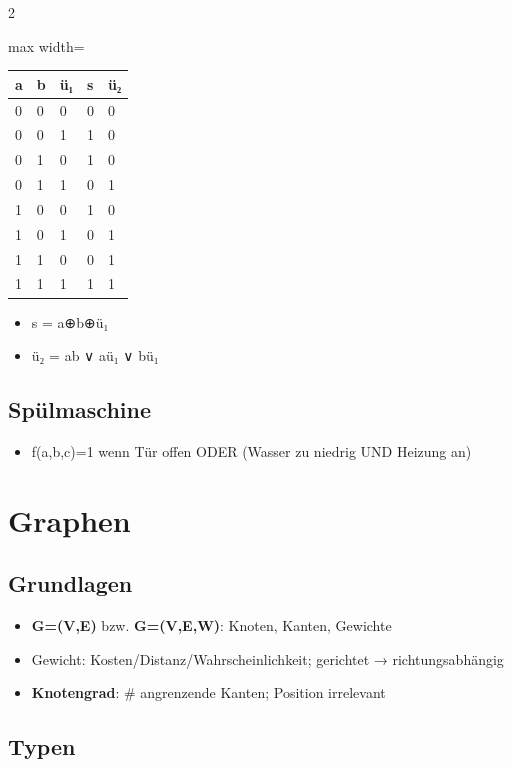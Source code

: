 \documentclass[10pt, a4paper]{article}
\begin{document}
\begin{multicols}{2}
{\small
\begin{adjustbox}{max width=\linewidth}
{\scriptsize
\begin{tabular}{lllll}
\toprule
\textbf{a} & \textbf{b} & \textbf{ü₁} & \textbf{s} & \textbf{ü₂} \\
\midrule
0 & 0 & 0 & 0 & 0 \\
0 & 0 & 1 & 1 & 0 \\
0 & 1 & 0 & 1 & 0 \\
0 & 1 & 1 & 0 & 1 \\
1 & 0 & 0 & 1 & 0 \\
1 & 0 & 1 & 0 & 1 \\
1 & 1 & 0 & 0 & 1 \\
1 & 1 & 1 & 1 & 1 \\
\bottomrule
\end{tabular}
}
\end{adjustbox}
}


\begin{itemize}
  \item s = a⊕b⊕ü₁
  \item ü₂ = ab ∨ aü₁ ∨ bü₁
\end{itemize}


\subsection{Spülmaschine}
\begin{itemize}
  \item f(a,b,c)=1 wenn Tür offen ODER (Wasser zu niedrig UND Heizung an)
\end{itemize}


\section{Graphen}


\subsection{Grundlagen}
\begin{itemize}
  \item \textbf{G=(V,E)} bzw. \textbf{G=(V,E,W)}: Knoten, Kanten, Gewichte
  \item Gewicht: Kosten/Distanz/Wahrscheinlichkeit; gerichtet → richtungsabhängig
  \item \textbf{Knotengrad}: \# angrenzende Kanten; Position irrelevant
\end{itemize}


\subsection{Typen}


\end{multicols}
\end{document}
